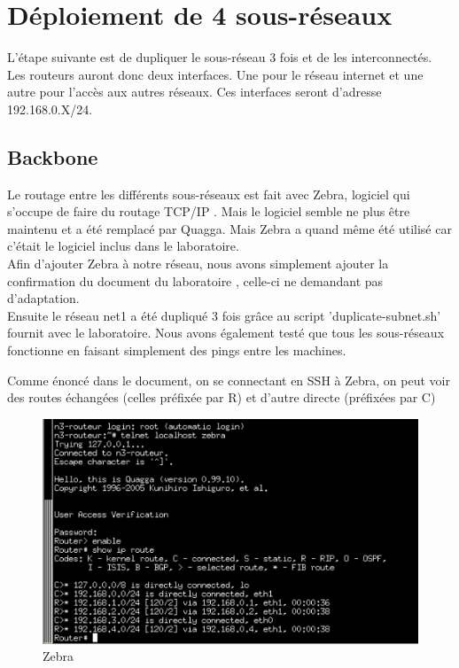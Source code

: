 \documentclass{article}
\begin{document}
\section{Déploiement de 4 sous-réseaux}

L'étape suivante est de dupliquer le sous-réseau 3 fois et de les interconnectés. Les routeurs auront donc deux interfaces. Une pour le réseau internet et une autre pour l'accès aux autres réseaux. Ces interfaces seront d'adresse 192.168.0.X/24.\\

\subsection{Backbone}

Le routage entre les différents sous-réseaux est fait avec Zebra, logiciel qui s'occupe de faire du routage TCP/IP \cite{Zebra}. Mais le logiciel semble ne plus être maintenu et a été remplacé par Quagga. Mais Zebra a quand même été utilisé car c'était le logiciel inclus dans le laboratoire.\\

Afin d'ajouter Zebra à notre réseau, nous avons simplement ajouter la confirmation du document du laboratoire \cite{doc-labo}, celle-ci ne demandant pas d'adaptation.\\

Ensuite le réseau net1 a été dupliqué 3 fois grâce au script 'duplicate-subnet.sh' fournit avec le laboratoire. Nous avons également testé que tous les sous-réseaux fonctionne en faisant simplement des pings entre les machines.

Comme énoncé dans le document, on se connectant en SSH à Zebra, on peut voir des routes échangées (celles préfixée par R) et d'autre directe (préfixées par C)

\begin{figure}[h]
	\centering
	\includegraphics{./captures/zebra-check.png}
	\caption{Zebra}
	\label{fig:Zebra}
\end{figure}
\end{document}
